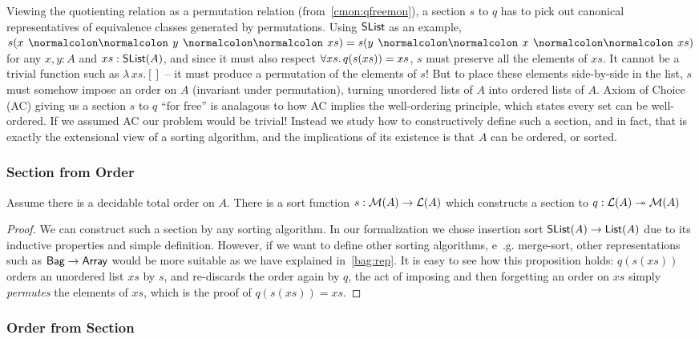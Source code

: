 Viewing the quotienting relation as a permutation relation (from~\cref{cmon:qfreemon}), a section $s$ to $q$ has to pick out
canonical representatives of equivalence classes generated by permutations.
%
Using $\operatorname{\mathsf{SList}}$ as an example, $s(x \cons y \cons xs) \id s(y \cons x \cons xs)$ for any $x, y : A$ and $xs : \operatorname{\mathsf{SList}}(A)$,
and since it must also respect $\forall xs.\,q(s(xs)) \id xs$, $s$ must preserve all the elements of $xs$.
It cannot be a trivial function such as $\lambda\,xs. []$ -- it must produce a permutation of the elements of $s$!
%
But to place these elements side-by-side in the list, $s$ must somehow impose an order on $A$
(invariant under permutation), turning unordered lists of $A$ into ordered lists of $A$.
%
Axiom of Choice (AC) giving us a section $s$ to $q$ ``for free'' is analagous to how
AC implies the well-ordering principle, which states every set can be well-ordered.
%
If we assumed AC our problem would be trivial!
%
Instead we study how to constructively define such a section, and in fact,
that is exactly the extensional view of a sorting algorithm,
and the implications of its existence is that $A$ can be ordered, or sorted.

\subsubsection{Section from Order}

\begin{proposition}
    Assume there is a decidable total order on $A$. There is a sort function $s: \mathcal{M}(A) \to \mathcal{L}(A)$
    which constructs a section to $q : \mathcal{L}(A) \twoheadrightarrow \mathcal{M}(A)$
\end{proposition}

\begin{proof}
    We can construct such a section by any sorting algorithm. In our formalization we chose
    insertion sort $\operatorname{\mathsf{SList}}(A) \to \operatorname{\mathsf{List}}(A)$ due to its inductive properties and simple definition.
    However, if we want to define other sorting algorithms, e .g. merge-sort,
    other representations such as $\operatorname{\mathsf{Bag}} \to \operatorname{\mathsf{Array}}$ would be more suitable as we have explained in~\cref{bag:rep}.
    It is easy to see how this
    proposition holds: $q(s(xs))$ orders an unordered list $xs$ by $s$, and re-discards the order again by
    $q$, the act of imposing and then forgetting an order on $xs$ simply \emph{permutes} the elements of $xs$,
    which is the proof of $q(s(xs)) = xs$.
\end{proof}

\subsubsection{Order from Section}

